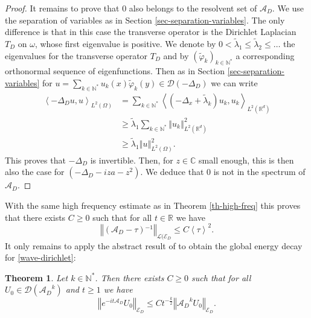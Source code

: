 \documentclass[10pt, a4paper,reqno]{amsart}
\theoremstyle{plain}
\newtheorem{theorem}{{Theorem}}[section]
\theoremstyle{definition}
\theoremstyle{remark}
\begin{document}
\begin{proof}
{\noindent {\bf $\bullet$}\quad } It remains to prove that 0 also belongs to the resolvent set of ${{{\mathcal A}}_D}$. We use the separation of variables as in Section \ref{sec-separation-variables}. The only difference is that in this case the transverse operator is the Dirichlet Laplacian ${T_D}$ on ${\omega}$, whose first eigenvalue is positive. We denote by $0 < \tilde {\lambda}_1 {\leqslant} \tilde {\lambda}_2 {\leqslant} \dots$ the eigenvalues for the transverse operator ${T_D}$ and by $(\tilde {\varphi}_k)_{k \in {\mathbb{N}}^*}$ a corresponding orthonormal sequence of eigenfunctions. Then as in Section \ref{sec-separation-variables} for $u = \sum_{k\in{\mathbb{N}}^*} u_k(x) \tilde {\varphi}_k (y) \in {{\mathcal D}}(-{{\Delta}_D})$ we can write
\begin{align*}
{\left< {-{{\Delta}_D} u} , {u} \right>}_{L^2({\Omega})}
& = \sum_{k \in {\mathbb{N}}^*} {\left< {(-{{\Delta}_x} + \tilde {\lambda}_k) u_k} , {u_k} \right>}_{L^2({\mathbb{R}}^d)}\\
& {\geqslant} \tilde {\lambda}_1 \sum_{k \in {\mathbb{N}}^*} {\left\Vert {u_k}\right\Vert}_{L^2({\mathbb{R}}^d)}^2\\
& {\geqslant} \tilde {\lambda}_1 {\left\Vert {u}\right\Vert}_{L^2({\Omega})}^2.
\end{align*}
This proves that $-{{\Delta}_D}$ is invertible. Then, for $z \in {\mathbb{C}}$ small enough, this is then also the case for $(-{{\Delta}_D} - iza - z^2)$. We deduce that 0 is not in the spectrum of ${{{\mathcal A}}_D}$.
\end{proof}

With the same high frequency estimate as in Theorem \ref{th-high-freq} this proves that there exists $C {\geqslant} 0$ such that for all $t \in {\mathbb{R}}$ we have 
\begin{equation} \label{estim-res-dir}
{\left\Vert {({{{\mathcal A}}_D} - {\tau}){^{-1}}}\right\Vert}_{{{\mathcal L}}({\mathscr E_D}} {\leqslant} C {\left< {\tau} \right>}^2.
\end{equation}
It only remains to apply the abstract result of \cite{BorichevTo10} to obtain the global energy decay for \eqref{wave-dirichlet}:

\begin{theorem} \label{th-energy-decay-dirichlet}
Let $k \in {\mathbb{N}}^*$. Then there exists $C {\geqslant} 0$ such that for all $U_0 \in {{\mathcal D}}({{{\mathcal A}}_D}^k)$ and $t {\geqslant} 1$ we have 
\[
{\left\Vert {e^{-it{{{\mathcal A}}_D}} U_0}\right\Vert}_{\mathscr E_D} {\leqslant} C t^{-\frac k 2} {\left\Vert {{{{\mathcal A}}_D}^k U_0}\right\Vert}_{\mathscr E_D}.
\]
\end{theorem}
\end{document}
